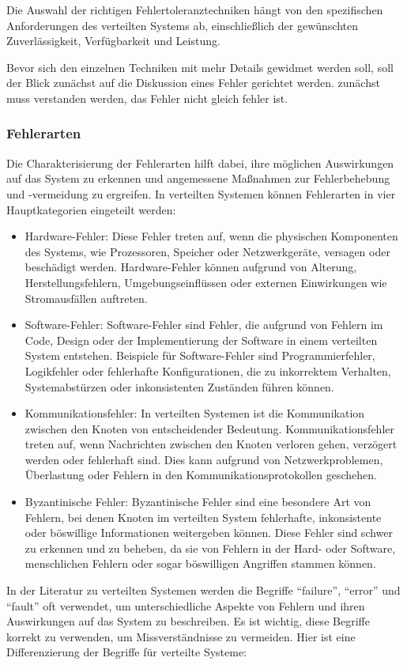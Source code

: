 Die Auswahl der richtigen Fehlertoleranztechniken hängt von den spezifischen Anforderungen des verteilten Systems ab, einschließlich der gewünschten Zuverlässigkeit, Verfügbarkeit und Leistung.

Bevor sich den einzelnen Techniken mit mehr Details gewidmet werden soll, soll der Blick zunächst auf die Diskussion eines Fehler gerichtet werden. zunächst muss verstanden werden, das Fehler nicht gleich fehler ist. 
\subsubsection{Fehlerarten}
Die Charakterisierung der Fehlerarten hilft dabei, ihre möglichen Auswirkungen auf das System zu erkennen und angemessene Maßnahmen zur Fehlerbehebung und -vermeidung zu ergreifen.
In verteilten Systemen können Fehlerarten in vier Hauptkategorien eingeteilt werden:
\begin{itemize}
\item Hardware-Fehler: Diese Fehler treten auf, wenn die physischen Komponenten des Systems, wie Prozessoren, Speicher oder Netzwerkgeräte, versagen oder beschädigt werden. Hardware-Fehler können aufgrund von Alterung, Herstellungsfehlern, Umgebungseinflüssen oder externen Einwirkungen wie Stromausfällen auftreten.
\item Software-Fehler: Software-Fehler sind Fehler, die aufgrund von Fehlern im Code, Design oder der Implementierung der Software in einem verteilten System entstehen. Beispiele für Software-Fehler sind Programmierfehler, Logikfehler oder fehlerhafte Konfigurationen, die zu inkorrektem Verhalten, Systemabstürzen oder inkonsistenten Zuständen führen können.
\item Kommunikationsfehler: In verteilten Systemen ist die Kommunikation zwischen den Knoten von entscheidender Bedeutung. Kommunikationsfehler treten auf, wenn Nachrichten zwischen den Knoten verloren gehen, verzögert werden oder fehlerhaft sind. Dies kann aufgrund von Netzwerkproblemen, Überlastung oder Fehlern in den Kommunikationsprotokollen geschehen.
\item Byzantinische Fehler: Byzantinische Fehler sind eine besondere Art von Fehlern, bei denen Knoten im verteilten System fehlerhafte, inkonsistente oder böswillige Informationen weitergeben können. Diese Fehler sind schwer zu erkennen und zu beheben, da sie von Fehlern in der Hard- oder Software, menschlichen Fehlern oder sogar böswilligen Angriffen stammen können.
\end{itemize}
In der Literatur zu verteilten Systemen werden die Begriffe \enquote{failure}, \enquote{error} und \enquote{fault} oft verwendet, um unterschiedliche Aspekte von Fehlern und ihren Auswirkungen auf das System zu beschreiben. Es ist wichtig, diese Begriffe korrekt zu verwenden, um Missverständnisse zu vermeiden. Hier ist eine Differenzierung der Begriffe für verteilte Systeme:

